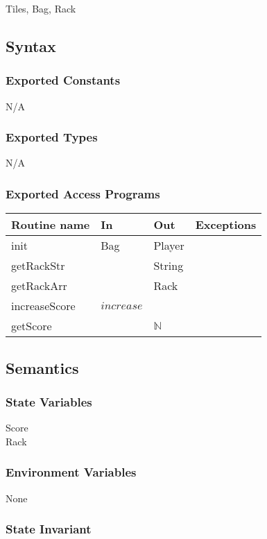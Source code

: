 \documentclass[12pt]{article}
\begin{document}
Tiles, Bag, Rack

\subsection* {Syntax}

\subsubsection* {Exported Constants}
N/A
\subsubsection* {Exported Types}

N/A

\subsubsection* {Exported Access Programs}

\begin{tabular}{| l | l | l | l |}
\hline
\textbf{Routine name} & \textbf{In} & \textbf{Out} & \textbf{Exceptions}\\
\hline
init & Bag & Player &  \\
\hline
getRackStr & & String & \\
\hline
getRackArr & & Rack & \\
\hline
increaseScore & $increase$ &  & \\
\hline
getScore & & $\mathbb{N}$ & \\
\hline
\end{tabular}

\subsection* {Semantics}

\subsubsection* {State Variables}

Score \\
Rack

\subsubsection* {Environment Variables}
None
\subsubsection* {State Invariant}
\end{document}
